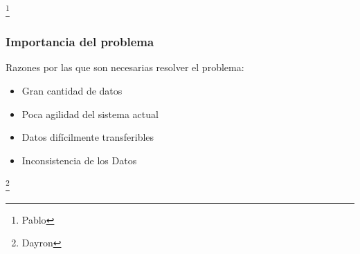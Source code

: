 \documentclass[14pt]{beamer}
\begin{document}
\begin{frame}
\begin{columns}
\begin{column}{0.5\textwidth}
\begin{center}

\end{center}
\end{column}
\end{columns}




\footnote{Pablo}
\end{frame}




\begin{frame}
\frametitle{Importancia del problema}
Razones por las que son necesarias resolver el problema:
\begin{itemize}
\item Gran cantidad de datos
\item Poca agilidad del sistema actual
\item Datos difícilmente transferibles
\item Inconsistencia de los Datos
\end{itemize}
\footnote{Dayron}
\end{frame}
\end{document}
